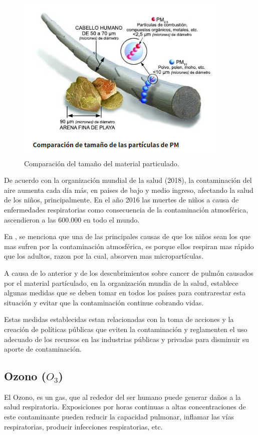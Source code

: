 \begin{figure}[!h]
\begin{center}
\includegraphics[scale=1.2]{cabello}
\end{center}
\centering
\caption{Comparación del tamaño del material particulado.}
\label{cabello}
\end{figure}


De acuerdo con la organización mundial de la salud (2018), la contaminación del aire aumenta cada día más, en paises de bajo y medio ingreso, afectando la salud de los niños, principalmente. En el año 2016 las muertes de niños a causa de enfermedades respiratorias como consecuencia de la contaminación atmosférica, ascendieron a las $600.000$ en todo el mundo. 

En \cite{OMS}, se menciona que una de las principales causas de que los niños sean los que mas sufren por la contaminación atmosférica, es porque ellos respiran mas rápido que los adultos, razon por la cual, absorven mas micropartículas. 

A causa de lo anterior y de los descubrimientos sobre cancer de pulmón causados por el material partículado, en \cite{IARC} la organización mundia de la salud, establece algunas medidas que se deben tomar en todos los países para contrarestar esta situación y evitar que la contaminación continue cobrando vidas. 

Estas medidas establecidas estan relacionadas con la toma de acciones y la creación de políticas públicas que eviten la contaminación y reglamenten el uso adecuado de los recursos en las industrias públicas y privadas para disminuir su aporte de contaminación. 

\subsection{Ozono ($O_3$)} El Ozono, es un gas, que al rededor del ser humano puede generar daños a la salud respiratoria. Exposiciones por horas continuas a altas concentraciones de este contaminante pueden reducir la capacidad pulmonar, inflamar las vías respiratorias, producir infecciones respiratorias, etc. 

